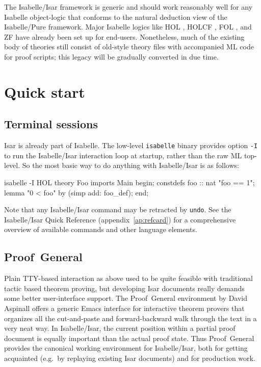 \medskip The Isabelle/Isar framework is generic and should work reasonably
well for any Isabelle object-logic that conforms to the natural deduction view
of the Isabelle/Pure framework.  Major Isabelle logics like HOL
\cite{isabelle-HOL}, HOLCF \cite{MuellerNvOS99}, FOL \cite{isabelle-logics},
and ZF \cite{isabelle-ZF} have already been set up for end-users.
Nonetheless, much of the existing body of theories still consist of old-style
theory files with accompanied ML code for proof scripts; this legacy will be
gradually converted in due time.


\section{Quick start}

\subsection{Terminal sessions}

Isar is already part of Isabelle.  The low-level \texttt{isabelle} binary
provides option \texttt{-I} to run the Isabelle/Isar interaction loop at
startup, rather than the raw ML top-level.  So the most basic way to do
anything with Isabelle/Isar is as follows:
\begin{ttbox}
isabelle -I HOL\medskip
{}\medskip
theory Foo imports Main begin;
constdefs foo :: nat  "foo == 1";
lemma "0 < foo" by (simp add: foo_def);
end;
\end{ttbox}
Note that any Isabelle/Isar command may be retracted by \texttt{undo}.  See
the Isabelle/Isar Quick Reference (appendix~\ref{ap:refcard}) for a
comprehensive overview of available commands and other language elements.


\subsection{Proof~General}

Plain TTY-based interaction as above used to be quite feasible with
traditional tactic based theorem proving, but developing Isar documents really
demands some better user-interface support.  The Proof~General environment by
David Aspinall \cite{proofgeneral,Aspinall:TACAS:2000} offers a generic Emacs
interface for interactive theorem provers that organizes all the cut-and-paste
and forward-backward walk through the text in a very neat way.  In
Isabelle/Isar, the current position within a partial proof document is equally
important than the actual proof state.  Thus Proof~General provides the
canonical working environment for Isabelle/Isar, both for getting acquainted
(e.g.\ by replaying existing Isar documents) and for production work.


